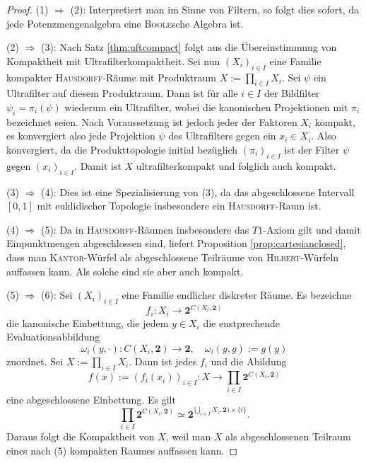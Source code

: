 \begin{proof}
  (1) $\Rightarrow$ (2): 
  Interpretiert man \PIT im Sinne von Filtern, so folgt dies sofort, da jede Potenzmengenalgebra eine \textsc{Boole}sche Algebra ist.

  (2) $\Rightarrow$ (3):
  Nach Satz \ref{thm:uftcompact} folgt aus \UFT die Übereinstimmung von Kompaktheit mit Ultrafilterkompaktheit.
  Sei nun $(X_i)_{i \in I}$ eine Familie kompakter \textsc{Hausdorff}-Räume mit Produktraum $X := \prod_{i \in I} X_i$.
  Sei $\psi$ ein Ultrafilter auf diesem Produktraum.
  Dann ist für alle $i \in I$ der Bildfilter $\psi_i = \pi_i(\psi)$ wiederum ein Ultrafilter, wobei die kanonischen Projektionen mit $\pi_i$ bezeichnet seien.
  Nach Voraussetzung ist jedoch jeder der Faktoren $X_i$ kompakt, es konvergiert also jede Projektion $\psi$ des Ultrafilters gegen ein $x_i \in X_i$.
  Also konvergiert, da die Produkttopologie initial bezüglich $(\pi_i)_{i \in I}$ ist der Filter $\psi$ gegen $(x_i)_{i \in I}$.
  Damit ist $X$ ultrafilterkompakt und folglich auch kompakt.

  (3) $\Rightarrow$ (4):
  Dies ist eine Spezialisierung von (3), da das abgeschlossene Intervall $[0,1]$ mit euklidischer Topologie insbesondere ein \textsc{Hausdorff}-Raum ist.

  (4) $\Rightarrow$ (5):
  Da in \textsc{Hausdorff}-Räumen insbesondere das $T1$-Axiom gilt und damit Einpunktmengen abgeschlossen sind, liefert Proposition \ref{prop:cartesianclosed}, dass man \textsc{Kantor}-Würfel als abgeschlossene Teilräume von \textsc{Hilbert}-Würfeln auffassen kann. 
  Als solche sind sie aber auch kompakt.

  (5) $\Rightarrow$ (6):
  Sei $(X_i)_{i \in I}$ eine Familie endlicher diskreter Räume.
  Es bezeichne
  \begin{displaymath}
    f_i \colon X_i \to \mathbf{2}^{C(X_i,\mathbf{2})}
  \end{displaymath}
  die kanonische Einbettung, die jedem  $y \in X_i$ die enstprechende Evaluationsabbildung
  \begin{displaymath}
    \omega_i(y,\cdot) \colon C(X_i,\mathbf{2}) \to \mathbf{2}, \quad \omega_i(y,g) := g(y)
  \end{displaymath}
  zuordnet.
  Sei $X := \prod_{i \in I} X_i$.
  Dann ist jedes $f_i$ und die Abildung
  \begin{displaymath}
    f(x) := (f_i(x_i))_{i \in I} \colon X \to \prod_{i \in I} \mathbf{2}^{C(X_i,\mathbf{2})}
  \end{displaymath}
  eine abgeschlossene Einbettung.
  Es gilt 
  \begin{displaymath}
    \prod_{i \in I} \mathbf{2}^{C(X_i,\mathbf{2})} \simeq \mathbf{2}^{\bigcup_{i \in I} X_i,\mathbf{2}) \times \{i\}}.
  \end{displaymath}
  Daraus folgt die Kompaktheit von $X$, weil man $X$ als abgeschlossenen Teilraum eines nach (5) kompakten Raumes auffassen kann.


\end{proof}
